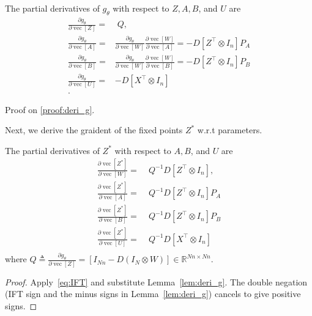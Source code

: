 \documentclass[twoside]{article}
\begin{document}
\begin{lemma}
\label{lem:deri_g}
The partial derivatives of $g_{\theta}$ with respect to $Z, A, B$, and $U$ are
\begin{align*}
    \frac{\partial g_{\theta}}{\partial \operatorname{vec}[Z]} =&\;Q, \\
    \frac{\partial g_{\theta}}{\partial \operatorname{vec}[A]} =& \frac{\partial g_{\theta}}{\partial \operatorname{vec}[W]} \frac{\partial \operatorname{vec}[W]}{\partial \operatorname{vec}[A]} = -D\left[Z^\top \otimes I_n\right] P_A\\
    \frac{\partial g_{\theta}}{\partial \operatorname{vec}[B]} =& \frac{\partial g_{\theta}}{\partial \operatorname{vec}[W]} \frac{\partial \operatorname{vec}[W]}{\partial \operatorname{vec}[B]} = - D\left[Z^\top \otimes I_n\right]P_B\\
    \frac{\partial g_{\theta}}{\partial \operatorname{vec}[U]} =& - D\left[X^\top \otimes I_n\right]\\.
\end{align*}
\end{lemma}

Proof on \ref{proof:deri_g}.

Next, we derive the graident of the fixed points $Z^*$ w.r.t parameters.
\begin{lemma}
\label{lem:deri_Z}
The partial derivatives of $Z^*$ with respect to $A, B$, and $U$ are
\begin{align*}
    \frac{\partial \operatorname{vec}[Z^*]}{\partial \operatorname{vec}[W]} =&\;Q^{-1} D\left[Z^\top \otimes I_n\right], \\
    \frac{\partial \operatorname{vec}[Z^*]}{\partial \operatorname{vec}[A]} =&\;Q^{-1} D\left[Z^\top \otimes I_n\right] P_A\\
    \frac{\partial \operatorname{vec}[Z^*]}{\partial \operatorname{vec}[B]} =&\;Q^{-1} D\left[Z^\top \otimes I_n\right] P_B\\
    \frac{\partial \operatorname{vec}[Z^*]}{\partial \operatorname{vec}[U]} =&\;Q^{-1}D\left[X^\top \otimes I_n\right]\\
\end{align*}
where $Q \triangleq \frac{\partial g_{\theta}}{\partial \operatorname{vec}[Z]} =  \left[I_{Nn}- D\left( I_N \otimes W\right)\right] \in \mathbb{R}^{Nn \times Nn}$.
\end{lemma}
\begin{proof}
Apply~\eqref{eq:IFT} and substitute Lemma~\ref{lem:deri_g}.  The double negation
(IFT sign and the minus signs in Lemma~\ref{lem:deri_g}) cancels to give positive signs.
\end{proof}
\end{document}
